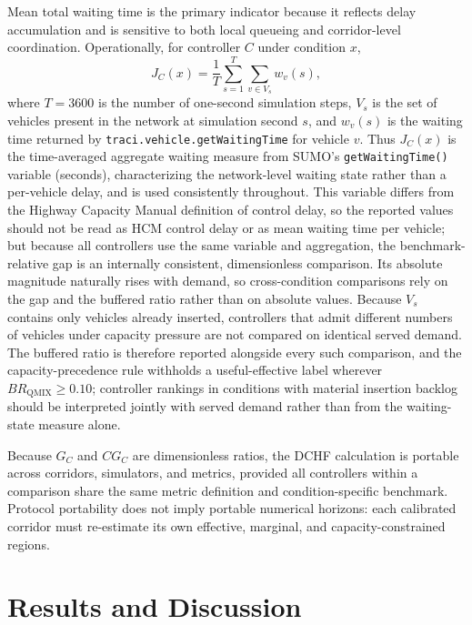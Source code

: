 \documentclass[review,12pt]{elsarticle}
\begin{document}
Mean total waiting time is the primary indicator because it reflects delay accumulation and is sensitive to both local queueing and corridor-level coordination. Operationally, for controller $C$ under condition $x$,
\begin{equation}
J_C(x) = \frac{1}{T}\sum_{s=1}^{T}\sum_{v \in V_s} w_v(s),
\label{eq:jc-definition}
\end{equation}
where $T=3600$ is the number of one-second simulation steps, $V_s$ is the set of vehicles present in the network at simulation second $s$, and $w_v(s)$ is the waiting time returned by \texttt{traci.vehicle.getWaitingTime} for vehicle $v$. Thus $J_C(x)$ is the time-averaged aggregate waiting measure from SUMO's \texttt{getWaitingTime()} variable (seconds), characterizing the network-level waiting state rather than a per-vehicle delay, and is used consistently throughout. This variable differs from the Highway Capacity Manual definition of control delay, so the reported values should not be read as HCM control delay or as mean waiting time per vehicle; but because all controllers use the same variable and aggregation, the benchmark-relative gap is an internally consistent, dimensionless comparison. Its absolute magnitude naturally rises with demand, so cross-condition comparisons rely on the gap and the buffered ratio rather than on absolute values. Because $V_s$ contains only vehicles already inserted, controllers that admit different numbers of vehicles under capacity pressure are not compared on identical served demand. The buffered ratio is therefore reported alongside every such comparison, and the capacity-precedence rule withholds a useful-effective label wherever $BR_{\mathrm{QMIX}}\geq0.10$; controller rankings in conditions with material insertion backlog should be interpreted jointly with served demand rather than from the waiting-state measure alone.

Because $G_C$ and $CG_C$ are dimensionless ratios, the DCHF calculation is portable across corridors, simulators, and metrics, provided all controllers within a comparison share the same metric definition and condition-specific benchmark. Protocol portability does not imply portable numerical horizons: each calibrated corridor must re-estimate its own effective, marginal, and capacity-constrained regions.

\section{Results and Discussion}
\label{sec:results_discussion}
\end{document}
